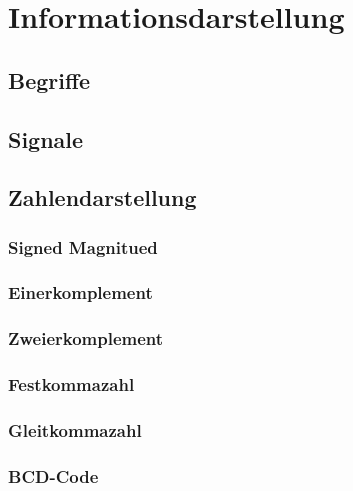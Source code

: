 \section{Informationsdarstellung}
\subsection{Begriffe}

\subsection{Signale}

\subsection{Zahlendarstellung}
\subsubsection{Signed Magnitued}
\subsubsection{Einerkomplement}
\subsubsection{Zweierkomplement}
\subsubsection{Festkommazahl}
\subsubsection{Gleitkommazahl}
\subsubsection{BCD-Code}